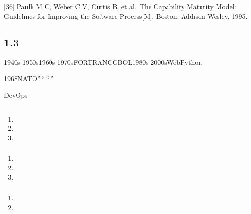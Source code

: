 {[}36{]} Paulk M C, Weber C V, Curtis B, et al.~The Capability Maturity
Model: Guidelines for Improving the Software Process{[}M{]}. Boston:
Addison-Wesley, 1995.

\subsection{1.3}\label{section-28}

1940s-1950s1960s-1970sFORTRANCOBOL1980s-2000sWebPython

1968NATO''\,``\,``\,''

DevOps

\subsection{}\label{section-29}

\subsubsection{}\label{section-30}

\begin{enumerate}
\def\labelenumi{\arabic{enumi}.}
\tightlist
\item
\item
\item
\end{enumerate}

\subsubsection{}\label{section-31}

\begin{enumerate}
\def\labelenumi{\arabic{enumi}.}
\tightlist
\item
\item
\item
\end{enumerate}

\subsubsection{}\label{section-32}

\begin{enumerate}
\def\labelenumi{\arabic{enumi}.}
\tightlist
\item
\item
\end{enumerate}

\subsection{}\label{section-33}